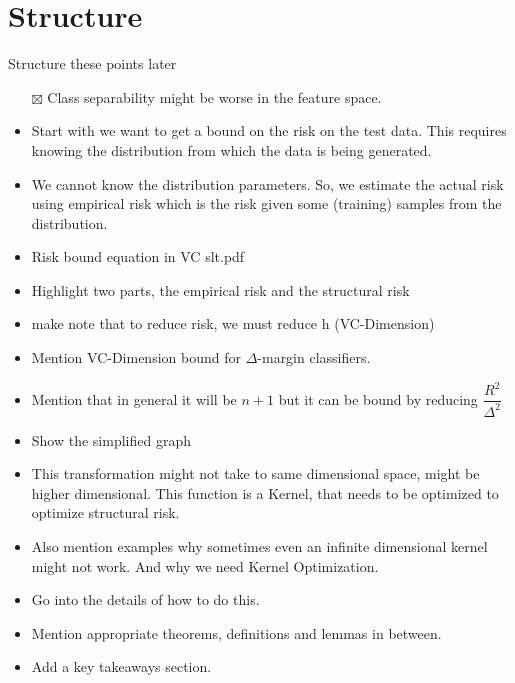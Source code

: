 \documentclass[11pt]{article}
\begin{document}
\section{Structure}
Structure these points later
    \begin{itemize}
        \item[$\boxtimes$] Class separability might be worse in the feature space.
        \item Start with we want to get a bound on the risk on the test data. This
            requires knowing the distribution from which the data is being generated.
        \item We cannot know the distribution parameters. So, we estimate the actual risk
            using empirical risk which is the risk given some (training) samples from the
            distribution.
        \item Risk bound equation in VC slt.pdf
        \item Highlight two parts, the empirical risk and the structural risk
        \item make note that to reduce risk, we must reduce h (VC-Dimension)
        \item Mention VC-Dimension bound for $\Delta$-margin classifiers.
        \item Mention that in general it will be $n+1$ but it can be bound by reducing
            $\displaystyle \dfrac{R^2}{\Delta^2}$
        \item Show the simplified graph
        \item This transformation might not take to same dimensional space, might be
            higher dimensional. This function is a Kernel, that needs to be optimized to
            optimize structural risk.
        \item Also mention examples why sometimes even an infinite dimensional kernel
            might not work. And why we need Kernel Optimization.
        \item Go into the details of how to do this.
        \item Mention appropriate theorems, definitions and lemmas in between.
        \item Add a key takeaways section.
    \end{itemize}
\end{document}
